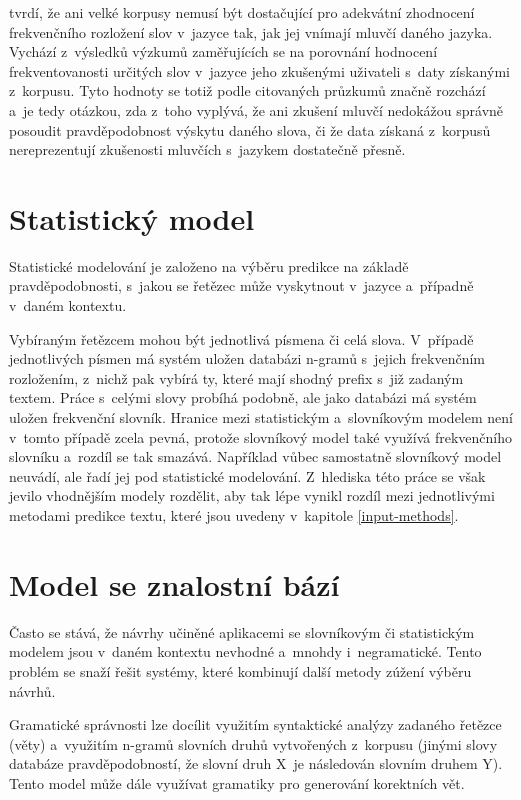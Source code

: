 \documentclass[a4paper,11pt,openany]{book} %
\begin{document}
\parencite{alderson2007judging} tvrdí, že ani velké korpusy nemusí být dostačující pro adekvátní zhodnocení frekvenčního rozložení slov v~jazyce tak, jak jej vnímají mluvčí daného jazyka. Vychází z~výsledků výzkumů zaměřujících se na porovnání hodnocení frekventovanosti určitých slov v~jazyce jeho zkušenými uživateli s~daty získanými z~korpusu. Tyto hodnoty se totiž podle citovaných průzkumů značně rozchází a~je tedy otázkou, zda z~toho vyplývá, že ani zkušení mluvčí nedokážou správně posoudit pravděpodobnost výskytu daného slova, či že data získaná z~korpusů nereprezentují zkušenosti mluvčích s~jazykem dostatečně přesně.

\section{Statistický model}

Statistické modelování je založeno na výběru predikce na základě pravděpodobnosti, s~jakou se řetězec může vyskytnout v~jazyce a~případně v~daném kontextu. \parencite[5233]{ghayoomi2009overview}

Vybíraným řetězcem mohou být jednotlivá písmena či celá slova. V~případě jednotlivých písmen má systém uložen databázi n-gramů s~jejich frekvenčním rozložením, z~nichž pak vybírá ty, které mají shodný prefix s~již zadaným textem. Práce s~celými slovy probíhá podobně, ale jako databázi má systém uložen frekvenční slovník. Hranice mezi statistickým a~slovníkovým modelem není v~tomto případě zcela pevná, protože slovníkový model také využívá frekvenčního slovníku a~rozdíl se tak smazává. Například \parencite{ghayoomi2009overview} vůbec samostatně slovníkový model neuvádí, ale řadí jej pod statistické modelování. Z~hlediska této práce se však jevilo vhodnějším modely rozdělit, aby tak lépe vynikl rozdíl mezi jednotlivými metodami predikce textu, které jsou uvedeny v~kapitole \ref{input-methods}.

\section{Model se znalostní bází}

Často se stává, že návrhy učiněné aplikacemi se slovníkovým či statistickým modelem jsou v~daném kontextu nevhodné a~mnohdy i~negramatické. Tento problém se snaží řešit systémy, které kombinují další metody zúžení výběru návrhů. 

Gramatické správnosti lze docílit využitím syntaktické analýzy zadaného řetězce (věty) a~využitím n-gramů slovních druhů vytvořených z~korpusu (jinými slovy databáze pravděpodobností, že slovní druh X~je následován slovním druhem Y). Tento model může dále využívat gramatiky pro generování korektních vět. \parencite[5234--5235]{ghayoomi2009overview}
\end{document}
